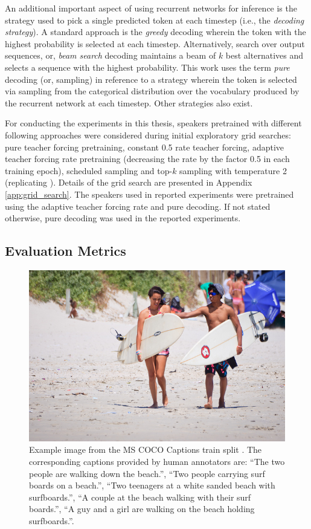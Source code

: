 An additional important aspect of using recurrent networks for inference is the strategy used to pick a single predicted token at each timestep (i.e., the \textit{decoding strategy}). A standard approach is the \textit{greedy} decoding wherein the token with the highest probability is selected at each timestep. Alternatively, search over output sequences, or, \textit{beam search} decoding maintains a beam of $k$ best alternatives and selects a sequence with the highest probability. This work uses the term \textit{pure} decoding (or, sampling) in reference to a strategy wherein the token is selected via sampling from the categorical distribution over the vocabulary produced by the recurrent network at each timestep. Other strategies also exist. 

For conducting the experiments in this thesis, speakers pretrained with different following approaches were considered during initial exploratory grid searches: pure teacher forcing pretraining, constant 0.5 rate teacher forcing, adaptive teacher forcing rate pretraining (decreasing the rate by the factor 0.5 in each training epoch), scheduled sampling and top-$k$ sampling with temperature 2 (replicating \cite{lazaridou2020multi}). Details of the grid search are presented in Appendix \ref{app:grid_search}. The speakers used in reported experiments were pretrained using the adaptive teacher forcing rate and pure decoding. If not stated otherwise, pure decoding was used in the reported experiments. 

\subsection{Evaluation Metrics}
\label{image_cap_metrics}

\begin{figure}
	\centering
	\includegraphics[width=0.7\linewidth]{images/COCO_train2014_example.jpg}
	\caption{Example image from the MS COCO Captions train split \parencite{chen2015microsoft}. The corresponding captions provided by human annotators are: ``The two people are walking down the beach.'', ``Two people carrying surf boards on a beach.'', ``Two teenagers at a white sanded beach with surfboards.'', ``A couple at the beach walking with their surf boards.'', ``A guy and a girl are walking on the beach holding surfboards.''. }
	\label{fig:coco_example}
\end{figure}

